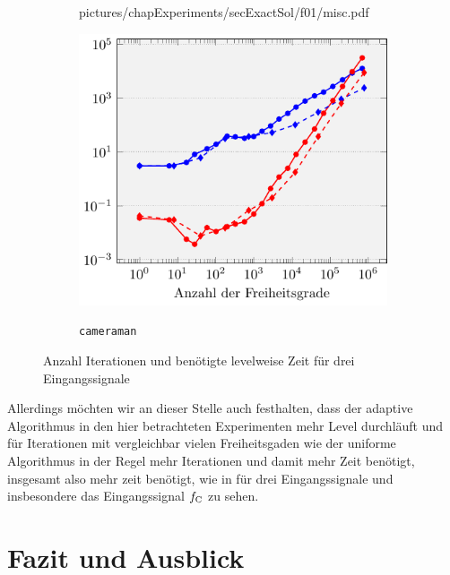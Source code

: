 \begin{figure}[p]
\begin{subfigure}{.32\linewidth}
      {pictures/chapExperiments/secExactSol/f01/misc.pdf}
    \label{fig:miscF01}
  \end{subfigure}
  \begin{subfigure}{.32\linewidth}
    \centering
    \caption{\texttt{cameraman}}
    \includegraphics[width=\linewidth]
      {pictures/chapExperiments/secGrayscale/cam/misc.pdf}
    \label{fig:miscCam}
  \end{subfigure}
  \caption{Anzahl Iterationen und benötigte levelweise Zeit für drei
  Eingangssignale}
  \label{fig:miscInSi}
\end{figure}
Allerdings möchten wir an dieser Stelle auch festhalten, dass 
der adaptive Algorithmus in den hier betrachteten Experimenten mehr Level
durchläuft und für Iterationen mit vergleichbar vielen Freiheitsgaden wie
der uniforme Algorithmus in der Regel mehr Iterationen und damit mehr
Zeit benötigt, insgesamt also mehr zeit benötigt, wie in 
für drei Eingangssignale und insbesondere das Eingangssignal $f_\textup{C}$
zu sehen.


\section{Fazit und Ausblick}

